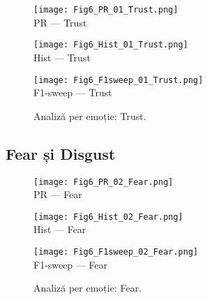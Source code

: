 \begin{figure}[H]
  \centering
  \begin{minipage}[t]{0.32\textwidth}\centering
    \texttt{[image: Fig6\_PR\_01\_Trust.png]}\\[-1mm]
    {\scriptsize PR — Trust}
  \end{minipage}\hfill
  \begin{minipage}[t]{0.32\textwidth}\centering
    \texttt{[image: Fig6\_Hist\_01\_Trust.png]}\\[-1mm]
    {\scriptsize Hist — Trust}
  \end{minipage}\hfill
  \begin{minipage}[t]{0.32\textwidth}\centering
    \texttt{[image: Fig6\_F1sweep\_01\_Trust.png]}\\[-1mm]
    {\scriptsize F1-sweep — Trust}
  \end{minipage}
  \caption{Analiză per emoție: Trust.}
  \label{fig:c6-trust}
\end{figure}

\subsection{Fear și Disgust}
\begin{figure}[H]
  \centering
  \begin{minipage}[t]{0.32\textwidth}\centering
    \texttt{[image: Fig6\_PR\_02\_Fear.png]}\\[-1mm]
    {\scriptsize PR — Fear}
  \end{minipage}\hfill
  \begin{minipage}[t]{0.32\textwidth}\centering
    \texttt{[image: Fig6\_Hist\_02\_Fear.png]}\\[-1mm]
    {\scriptsize Hist — Fear}
  \end{minipage}\hfill
  \begin{minipage}[t]{0.32\textwidth}\centering
    \texttt{[image: Fig6\_F1sweep\_02\_Fear.png]}\\[-1mm]
    {\scriptsize F1-sweep — Fear}
  \end{minipage}
  \caption{Analiză per emoție: Fear.}
  \label{fig:c6-fear}
\end{figure}

